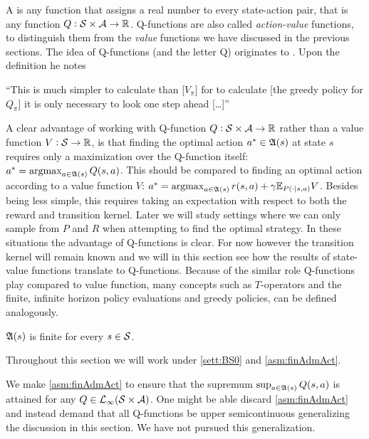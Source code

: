 A  is any function that assigns a real number
to every state-action pair, that is any function $Q : \mathcal{S} \times \mathcal{A}
\to \mathbb{R}$. Q-functions are also called \emph{action-value} functions,
to distinguish them from the \emph{value} functions we have discussed in the
previous sections.
The idea of Q-functions (and the letter Q) originates to
. Upon the definition he notes
\begin{displayquote}
  ``This is much simpler to calculate than [$V_\pi$]
  for to calculate [the greedy policy for $Q_\pi$] it is only necessary to look one
  step ahead [\ldots]''
\end{displayquote}
A clear advantage of working with Q-function
$Q:\mathcal{S}\times\mathcal{A} \to \mathbb{R}$ rather than a value function
$V:\mathcal{S}\to \mathbb{R}$,
is that finding the optimal action $a^* \in \frak{A}(s)$ at state $s$
requires only a maximization over the Q-function itself:
$a^* = \operatorname*{argmax}_{a \in \frak{A}(s)} Q(s,a)$.
This should be compared to finding an optimal action
according to a value function $V$:
$a^* = \operatorname*{argmax}_{a \in \frak{A}(s)} r(s,a) + \gamma \mathbb{E}_{P(\cdot \mid s,a)} V$.
Besides being less simple,
this requires taking an expectation with respect to 
both the reward and transition kernel.
Later we will study settings where we can only sample from $P$ and $R$
when attempting to find the optimal strategy.
In these situations the advantage of Q-functions is clear.
For now however the transition kernel will remain known and we
will in this section see how the results of state-value functions
translate to Q-functions.
Because of the similar role Q-functions play compared to value function,
many concepts such as $T$-operators and the finite, infinite horizon
policy evaluations and greedy policies, can be defined analogously.

\begin{asm}
  $\frak{A}(s)$ is finite for every $s \in \mathcal{S}$. 
  \label{asm:finAdmAct}
\end{asm}
Throughout this section we will work under
\cref{sett:BS0} and \cref{asm:finAdmAct}.

\begin{rem}
  We make \cref{asm:finAdmAct} to ensure that the supremum
  $\sup_{a \in \frak{A}(s)} Q(s, a)$ is attained for any
  $Q \in \mathcal{L}_\infty(\mathcal{S} \times \mathcal{A})$.
  One might be able discard \cref{asm:finAdmAct} and instead
  demand that all Q-functions be
  upper semicontinuous generalizing the discussion in this section.
  We have not pursued this generalization.
\end{rem}

